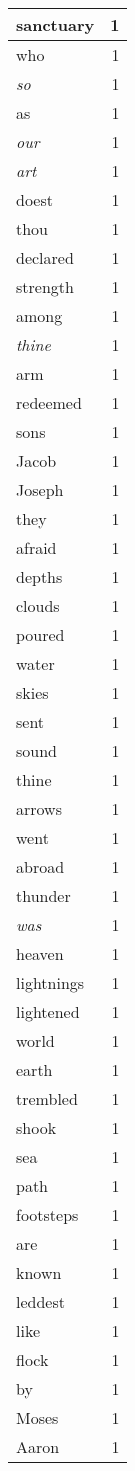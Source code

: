 \begin{center}
\begin{longtable}{l|r}
sanctuary & 1\\ \hline 
who & 1\\ \hline 
\emph{so} & 1\\ \hline 
as & 1\\ \hline 
\emph{our} & 1\\ \hline 
\emph{art} & 1\\ \hline 
doest & 1\\ \hline 
thou & 1\\ \hline 
declared & 1\\ \hline 
strength & 1\\ \hline 
among & 1\\ \hline 
\emph{thine} & 1\\ \hline 
arm & 1\\ \hline 
redeemed & 1\\ \hline 
sons & 1\\ \hline 
Jacob & 1\\ \hline 
Joseph & 1\\ \hline 
they & 1\\ \hline 
afraid & 1\\ \hline 
depths & 1\\ \hline 
clouds & 1\\ \hline 
poured & 1\\ \hline 
water & 1\\ \hline 
skies & 1\\ \hline 
sent & 1\\ \hline 
sound & 1\\ \hline 
thine & 1\\ \hline 
arrows & 1\\ \hline 
went & 1\\ \hline 
abroad & 1\\ \hline 
thunder & 1\\ \hline 
\emph{was} & 1\\ \hline 
heaven & 1\\ \hline 
lightnings & 1\\ \hline 
lightened & 1\\ \hline 
world & 1\\ \hline 
earth & 1\\ \hline 
trembled & 1\\ \hline 
shook & 1\\ \hline 
sea & 1\\ \hline 
path & 1\\ \hline 
footsteps & 1\\ \hline 
are & 1\\ \hline 
known & 1\\ \hline 
leddest & 1\\ \hline 
like & 1\\ \hline 
flock & 1\\ \hline 
by & 1\\ \hline 
Moses & 1\\ \hline 
Aaron & 1\\ \hline 
\end{longtable}
\end{center}



